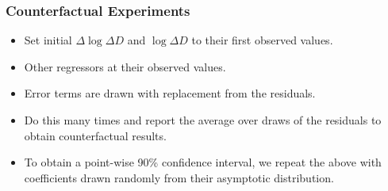 \documentclass{beamer}
\begin{document}


\begin{frame}
  \frametitle{Counterfactual Experiments}

\begin{itemize}
\item
Set initial \(\Delta \log \Delta D\) and
\(\log \Delta D\)  to their first observed values. \smallskip
\item  Other regressors at their observed
values. \smallskip
\item Error terms are drawn with replacement from the residuals.\smallskip
\item Do this many times and report the average over draws of the
residuals to obtain counterfactual results.   \smallskip

\item To obtain a point-wise 90\% confidence interval, we repeat the above with
coefficients drawn randomly from their asymptotic distribution.

 
\end{itemize}


\end{frame}


\end{document}

